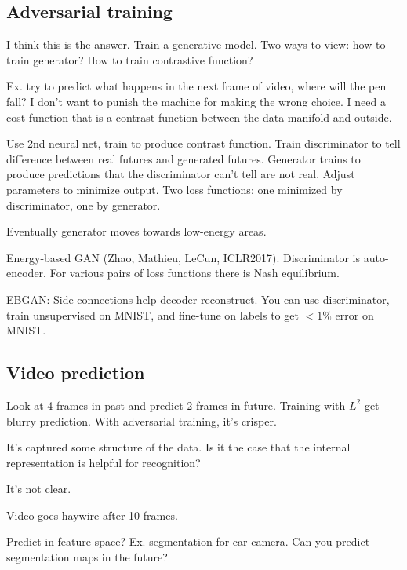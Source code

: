 \subsection{Adversarial training}

I think this is the answer. Train a generative model. Two ways to view: how to train generator? How to train contrastive function?

Ex. try to predict what happens in the next frame of video, where will the pen fall?  %
I don't want to punish the machine for making the wrong choice. I need a cost function that is a contrast function between the data manifold and outside.

Use 2nd neural net, train to produce contrast function. Train discriminator to tell difference between real futures and generated futures. Generator trains to produce predictions that the discriminator can't tell are not real. Adjust parameters to minimize output. Two loss functions: one minimized by discriminator, one by generator.

Eventually generator moves towards low-energy areas. 

Energy-based GAN (Zhao, Mathieu, LeCun, ICLR2017).
Discriminator is auto-encoder. 
For various pairs of loss functions there is Nash equilibrium. 

EBGAN: Side connections help decoder reconstruct. You can use discriminator, train unsupervised on MNIST, and fine-tune on labels to get $<1\%$ error on MNIST.

\subsection{Video prediction}
Look at 4 frames in past and predict 2 frames in future. Training with $L^2$ get blurry prediction. With adversarial training, it's crisper.

It's captured some structure of the data. Is it the case that the internal representation is helpful for recognition?

It's not clear. 

Video goes haywire after 10 frames.

Predict in feature space? Ex. segmentation for car camera. Can you predict segmentation maps in the future? 

